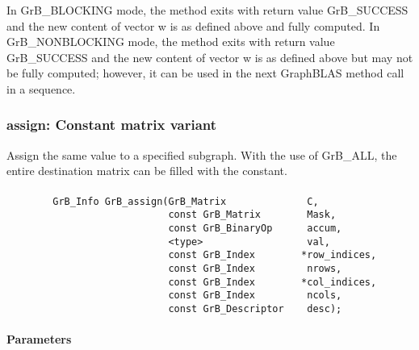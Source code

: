 In {\sf GrB\_BLOCKING} mode, the method exits with return value 
{\sf GrB\_SUCCESS} and the new content of vector {\sf w} is as defined above
and fully computed.  
In {\sf GrB\_NONBLOCKING} mode, the method exits with return value 
{\sf GrB\_SUCCESS} and the new content of vector {\sf w} is as defined above 
but may not be fully computed; however, it can be used in the next GraphBLAS 
method call in a sequence.



\subsubsection{{\sf assign}: Constant matrix variant}

Assign the same value to a specified subgraph.  With the use of {\sf GrB\_ALL}, 
the entire destination matrix can be filled with the constant.

\paragraph{\syntax}

\begin{verbatim}
        GrB_Info GrB_assign(GrB_Matrix              C,
                            const GrB_Matrix        Mask,
                            const GrB_BinaryOp      accum,
                            <type>                  val,
                            const GrB_Index        *row_indices,
                            const GrB_Index         nrows,
                            const GrB_Index        *col_indices,
                            const GrB_Index         ncols,
                            const GrB_Descriptor    desc);
\end{verbatim}

\paragraph{Parameters}

